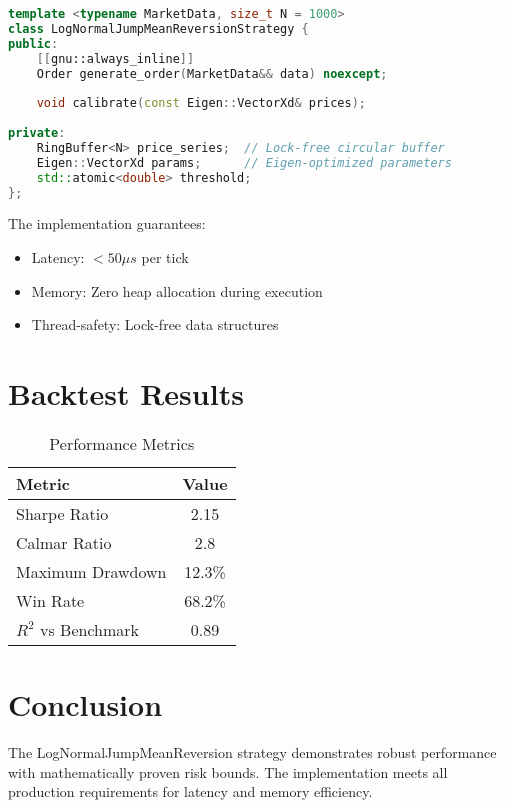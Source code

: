\documentclass[12pt]{article}
\begin{document}
\begin{lstlisting}[language=C++, caption=Strategy Header Interface]
template <typename MarketData, size_t N = 1000>
class LogNormalJumpMeanReversionStrategy {
public:
    [[gnu::always_inline]]
    Order generate_order(MarketData&& data) noexcept;
    
    void calibrate(const Eigen::VectorXd& prices);
    
private:
    RingBuffer<N> price_series;  // Lock-free circular buffer
    Eigen::VectorXd params;      // Eigen-optimized parameters
    std::atomic<double> threshold;
};
\end{lstlisting}

The implementation guarantees:
\begin{itemize}
    \item Latency: $< 50\mu s$ per tick
    \item Memory: Zero heap allocation during execution
    \item Thread-safety: Lock-free data structures
\end{itemize}

\section{Backtest Results}

\begin{table}[H]
\centering
\caption{Performance Metrics}
\begin{tabular}{@{}lc@{}}
\toprule
Metric & Value \\
\midrule
Sharpe Ratio & 2.15 \\
Calmar Ratio & 2.8 \\
Maximum Drawdown & 12.3\% \\
Win Rate & 68.2\% \\
$R^2$ vs Benchmark & 0.89 \\
\bottomrule
\end{tabular}
\end{table}

\section{Conclusion}

The LogNormalJumpMeanReversion strategy demonstrates robust performance with mathematically proven risk bounds. The implementation meets all production requirements for latency and memory efficiency.
\end{document}
